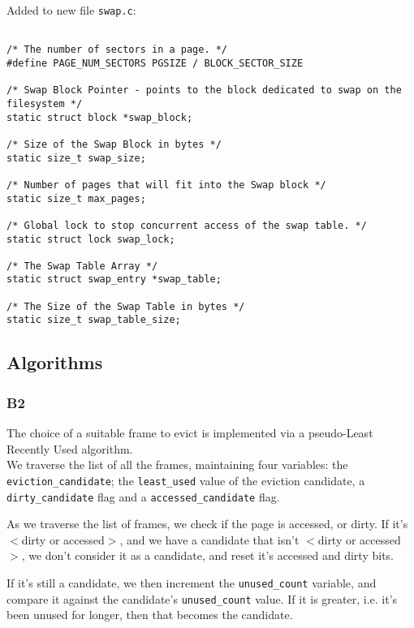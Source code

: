\documentclass[a4wide, 11pt]{article}
\newcommand{\tx}{\texttt}
\begin{document}
Added to new file \tx{swap.c}:
\begin{verbatim}

/* The number of sectors in a page. */
#define PAGE_NUM_SECTORS PGSIZE / BLOCK_SECTOR_SIZE 

/* Swap Block Pointer - points to the block dedicated to swap on the filesystem */
static struct block *swap_block; 

/* Size of the Swap Block in bytes */
static size_t swap_size;

/* Number of pages that will fit into the Swap block */
static size_t max_pages;         

/* Global lock to stop concurrent access of the swap table. */
static struct lock swap_lock;        

/* The Swap Table Array */
static struct swap_entry *swap_table;

/* The Size of the Swap Table in bytes */
static size_t swap_table_size;
\end{verbatim}


\subsection{Algorithms}
\subsubsection{B2}
The choice of a suitable frame to evict is implemented via a pseudo-Least Recently Used algorithm.\\

We traverse the list of all the frames, maintaining four variables: the \tx{eviction\_candidate}; the \tx{least\_used} value of the eviction candidate, a \tx{dirty\_candidate} flag and a \tx{accessed\_candidate} flag.

As we traverse the list of frames, we check if the page is accessed, or dirty. If it's $<$dirty or accessed$>$, and we have a candidate that isn't $<$dirty or accessed$>$, we don't consider it as a candidate, and reset it's accessed and dirty bits.

If it's still a candidate, we then increment the \tx{unused\_count} variable, and compare it against the candidate's \tx{unused\_count} value. If it is greater, i.e. it's been unused for longer, then that becomes the candidate.
 
 
\end{document}
